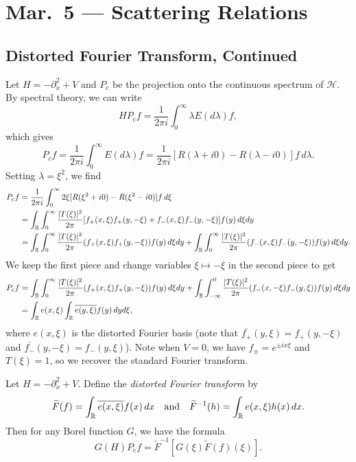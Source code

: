 \chapter{Mar.~5 --- Scattering Relations}

\section{Distorted Fourier Transform, Continued}

\begin{remark}
  Let $H = -\partial_x^2 + V$ and $P_{\mathrm{c}}$
  be the projection onto the continuous spectrum of
  $\mathcal{H}$. By spectral theory, we can write
  \[
    H P_{\mathrm{c}} f
    = \frac{1}{2\pi i} \int_0^\infty \lambda E(d\lambda) f,
  \]
  which gives
  \[
    P_c f
    = \frac{1}{2\pi i} \int_0^\infty E(d\lambda) f
    = \frac{1}{2\pi i} [R(\lambda + i 0) - R(\lambda - i 0)] f\, d\lambda
  .\]
  Setting $\lambda = \xi^2$, we find
  \begin{align*}
    P_{\mathrm{c}} f
    &= \frac{1}{2\pi i} \int_0^\infty 2\xi [R(\xi^2 + i 0) - R(\xi^2 - i 0)] f\, d\xi \\
    &= \int_{\mathbb{R}} \int_0^\infty
    \frac{|T(\xi)|^2}{2\pi} [f_+(x, \xi)f_+(y, -\xi) + f_-(x, \xi) f_-(y, -\xi)] f(y)\,
    d\xi dy \\
    &= 
    \int_{\mathbb{R}} \int_0^\infty
    \frac{|T(\xi)|^2}{2\pi} (f_+(x, \xi)f_+(y, -\xi)) f(y)\,
    d\xi dy
    +
    \int_{\mathbb{R}} \int_0^\infty
    \frac{|T(\xi)|^2}{2\pi} (f_-(x, \xi)f_-(y, -\xi)) f(y)\,
    d\xi dy.
  \end{align*}
  We keep the first piece and
  change variables $\xi \mapsto -\xi$ in the second
  piece to get
  \begin{align*}
    P_{\mathrm{c}} f
    &= \int_{\mathbb{R}} \int_0^\infty
    \frac{|T(\xi)|^2}{2\pi} (f_+(x, \xi)f_+(y, -\xi)) f(y)\,
    d\xi dy
    +
    \int_{\mathbb{R}} \int_{-\infty}^0
    \frac{|T(\xi)|^2}{2\pi} (f_-(x, -\xi)f_-(y, \xi)) f(y)\,
    d\xi dy \\
    &= \int_{\mathbb{R}} e(x, \xi) \int_{\mathbb{R}} \overline{e(y, \xi)} f(y)\, dy d\xi,
  \end{align*}
  where $e(x, \xi)$ is the distorted Fourier basis
  (note that
  $\overline{f_+}(y, \xi) = f_+(y, -\xi)$
  and $\overline{f_-}(y, -\xi) = f_-(y, \xi)$).
  Note when $V = 0$, we have
  $f_\pm = e^{\pm i x \xi}$ and
  $T(\xi) = 1$, so we recover the standard Fourier
  transform.
\end{remark}

\begin{corollary}
  Let $H = -\partial_x^2 + V$. Define the
  \emph{distorted Fourier transform} by
  \[
    \widetilde{F}(f) = \int_{\mathbb{R}} \overline{e(x, \xi)} f(x)\, dx \quad \text{and} \quad
    \widetilde{F}^{-1}(h) = \int_{\mathbb{R}} e(x, \xi) h(x)\, dx.
  \]
  Then for any Borel function $G$, we have
  the formula
  \[
    G(H) P_{\mathrm{c}} f
    = \widetilde{F}^{-1} [G(\xi) \widetilde{F}(f)(\xi)].
  \]
\end{corollary}

